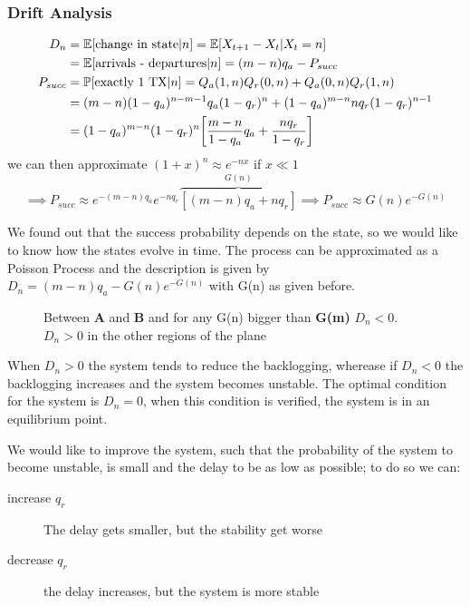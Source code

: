 \subsubsection{Drift Analysis}
\begin{equation}
	\begin{split}
		D_n &= \mathbb{E}[\text{change in state} | n] = \mathbb{E}[X_{t+1} - X_t | X_t = n] \\
		&= \mathbb{E}[\text{arrivals - departures} | n ] = (m-n) q_a - P_{succ} \\
		P_{succ}&= \mathbb{P}[\text{exactly 1 TX}|n] = Q_a(1,n) Q_r(0,n) + Q_a(0,n) Q_r(1,n) \\
		&= (m-n)(1-q_a)^{n-m-1} q_a (1-q_r)^n + (1-q_a)^{m-n} n q_r (1-q_r)^{n-1} \\
		&= (1-q_a)^{m-n} (1-q_r)^n \bigg[\frac{m-n}{1-q_a} q_a + \frac{n q_r}{1-q_r}\bigg]
	\end{split}
\end{equation}
we can then approximate $(1+x)^n \approx e^{-n x}$ if $x \ll 1$
\begin{equation}
	\implies P_{succ} \approx e^{-(m-n) q_a} e^{-n q_r} \overbrace{[(m-n) q_a + n q_r]}^{G(n)}
	\implies P_{succ} \approx G(n)e^{-G(n)}
\end{equation}

We found out that the success probability depends on the state, so we would like to know how the states evolve in time.
The process can be approximated as a Poisson Process and the description is given by $D_n = (m-n) q_a - G(n) e^{-G(n)}$
with G(n) as given before.

\begin{figure}
	\centering
	
	\caption{Between \textbf{A} and \textbf{B} and for any G(n) bigger than \textbf{G(m)} $D_n <0$. $D_n>0$ in the other regions of the plane}
	\label{fig:drift}
\end{figure}

When $D_n>0$ the system tends to reduce the backlogging, wherease if $D_n<0$ the backlogging increases and the system becomes unstable. The optimal condition for the system is $D_n = 0$, when this condition is verified, the system is in an equilibrium point.

We would like to improve the system, such that the probability of the system to become
unstable, is small and the delay to be as low as possible; to do so we can:
\begin{description}
	\item[increase $q_r$] The delay gets smaller, but the stability get worse
	\item[decrease $q_r$] the delay increases, but the system is more stable
\end{description}

